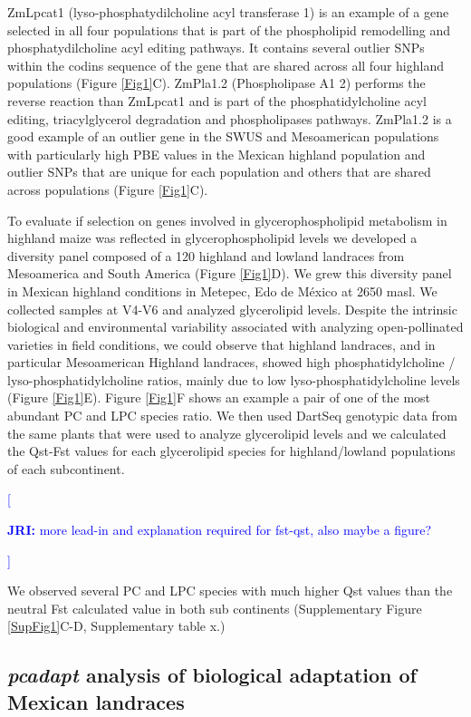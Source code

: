 \documentclass[9pt,twocolumn,twoside,lineno]{gsajnl}
\newcommand{\jri}[1]{\textcolor{blue}{[\begin{tiny}\textbf{JRI:} {#1}\end{tiny}]}}
\begin{document}
ZmLpcat1 (lyso-phosphatydilcholine acyl transferase 1) is an example of a gene selected in all four populations that is part of the phospholipid remodelling and phosphatydilcholine acyl editing pathways. 
It contains several outlier SNPs within the codins sequence of the gene that are shared across all four highland populations (Figure \ref{Fig1}C). ZmPla1.2 (Phospholipase A1 2) performs the reverse reaction than ZmLpcat1 and is part of the phosphatidylcholine acyl editing, triacylglycerol degradation and phospholipases pathways. 
ZmPla1.2 is a good example of an outlier gene in the SWUS and Mesoamerican populations with particularly high PBE values in the Mexican highland population and outlier SNPs that are unique for each population and others that are shared across populations (Figure \ref{Fig1}C).

To evaluate if selection on genes involved in glycerophospholipid metabolism in highland maize was reflected in glycerophospholipid levels we developed a diversity panel composed of a 120 highland and lowland landraces from Mesoamerica and South America (Figure \ref{Fig1}D). 
We grew this diversity panel in Mexican highland conditions in Metepec, Edo de México at 2650 masl. We collected samples at V4-V6 and analyzed glycerolipid levels. 
Despite the intrinsic biological and environmental variability associated with analyzing open-pollinated varieties in field conditions, we could observe that highland landraces, and in particular Mesoamerican Highland landraces, showed  high phosphatidylcholine / lyso-phosphatidylcholine ratios, mainly due to low lyso-phosphatidylcholine levels (Figure \ref{Fig1}E). 
Figure \ref{Fig1}F shows an example a pair of one of the most abundant PC and LPC species ratio. 
We then used DartSeq genotypic data from the same plants that were used to analyze glycerolipid levels and we calculated the Qst-Fst values for each glycerolipid species for highland/lowland populations of each subcontinent.
\jri{more lead-in and explanation required for  fst-qst, also maybe a figure?}
We observed several PC and LPC species with much higher Qst values than the neutral Fst calculated value in both sub continents (Supplementary Figure \ref{SupFig1}C-D, Supplementary table x.) 

\subsection{\textit{pcadapt} analysis of biological adaptation of Mexican landraces} 
\end{document}
